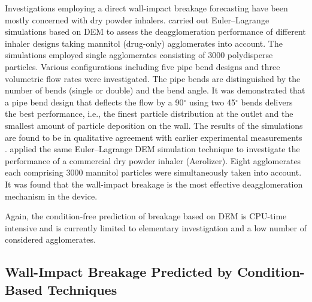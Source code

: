 Investigations employing a direct wall-impact breakage forecasting
have been mostly concerned with dry powder
inhalers. \citet{tong2011numerical} carried out Euler--Lagrange
simulations based on DEM to assess the deagglomeration performance of
different inhaler designs taking mannitol (drug-only) agglomerates
into account. The simulations employed single agglomerates consisting
of 3000 polydisperse particles. Various configurations including five
pipe bend designs and three volumetric flow rates were
investigated. The pipe bends are distinguished by the number of bends
(single or double) and the bend angle.  It was demonstrated that a
pipe bend design that deflects the flow by a 90$^\circ$ using two
45$^\circ$ bends delivers the best performance, i.e., the finest
particle distribution at the outlet and the smallest amount of
particle deposition on the wall. The results of the simulations are
found to be in qualitative agreement with earlier experimental
measurements \citep{adi2010impact}.  \citet{tong2013cfd} applied the
same Euler--Lagrange DEM simulation technique to investigate the
performance of a commercial dry powder inhaler
(Aerolizer{\textregistered}). Eight agglomerates each comprising 3000
mannitol particles were simultaneously taken into account. It was
found that the wall-impact breakage is the most effective
deagglomeration mechanism in the device.

Again, the condition-free prediction of breakage based on DEM is
CPU-time intensive and is currently limited to elementary
investigation and a low number of considered agglomerates.

\subsection{Wall-Impact Breakage Predicted by Condition-Based
Techniques}
\label{sec:break_wall_replace}

